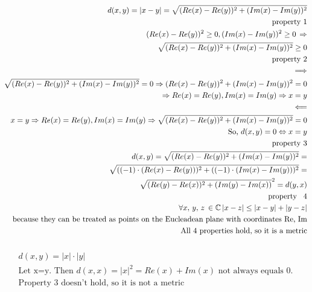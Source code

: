 \documentclass[11pt,a4paper]{scrartcl}
\begin{document}
\subsubsection{} %
\begin{align}
d(x, y) = |x - y| = \sqrt{(Re(x) - Re(y))^2 + (Im(x) - Im(y))^2}\\
\text{property 1}\\
(Re(x) - Re(y))^2 \geq 0, (Im(x) - Im(y))^2 \geq 0\, \Rightarrow\\
\sqrt{(Re(x) - Re(y))^2 + (Im(x) - Im(y))^2} \geq 0\\
\text{property 2}\\
\Longrightarrow\\
\sqrt{(Re(x) - Re(y))^2 + (Im(x) - Im(y))^2}= 0 \Rightarrow (Re(x) - Re(y))^2 + (Im(x) - Im(y))^2 = 0\\
\Rightarrow Re(x)=Re(y), Im(x)=Im(y) \Rightarrow x=y \\
\Longleftarrow\\
x=y \Rightarrow Re(x) = Re(y), Im(x) = Im(y) \Rightarrow \sqrt{(Re(x) - Re(y))^2 + (Im(x) - Im(y))^2}= 0\\
\text{So, $d(x, y) = 0 \Leftrightarrow x=y$}\\
\text{property 3}\\
d(x, y) = \sqrt{(Re(x) - Re(y))^2 + (Im(x) - Im(y))^2} =\\
\sqrt{((-1) \cdot (Re(x) - Re(y)))^2 + ((-1) \cdot (Im(x) - Im(y)))^2}=\\
\sqrt{(Re(y) - Re(x))^2 + (Im(y) - Im(x))}^2 = d(y, x)\\
\text{property \, 4}\\
\forall x,\,y,\,z\, \in \mathbb{C} \, |x - z| \leq |x - y| + |y - z| \\
\text{because they can be treated as points on the Eucleadean plane with coordinates Re, Im}\\
\text{All 4 properties hold, so it is a metric}
\end{align}

\subsubsection{} %
\begin{align}
d(x, y) = |x| \cdot |y|\\
\text{Let x=y. Then } d(x ,x) = |x|^2 = Re(x) + Im(x) \text{ not always equals 0.}\\
\text{Property 3 doesn't hold, so it is not a metric}
\end{align}
\end{document}
